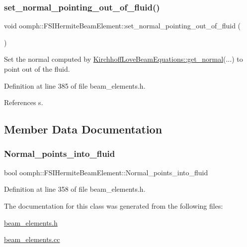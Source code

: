 \subsubsection{\texorpdfstring{set\+\_\+normal\+\_\+pointing\+\_\+out\+\_\+of\+\_\+fluid()}{set\_normal\_pointing\_out\_of\_fluid()}}
{\footnotesize\ttfamily void oomph\+::\+F\+S\+I\+Hermite\+Beam\+Element\+::set\+\_\+normal\+\_\+pointing\+\_\+out\+\_\+of\+\_\+fluid (\begin{DoxyParamCaption}{ }\end{DoxyParamCaption})\hspace{0.3cm}{\ttfamily [inline]}}



Set the normal computed by \hyperlink{classoomph_1_1KirchhoffLoveBeamEquations_a963a2ffb3c4008e3b9c175fc1d2d94cc}{Kirchhoff\+Love\+Beam\+Equations\+::get\+\_\+normal}(...) to point out of the fluid. 



Definition at line 385 of file beam\+\_\+elements.\+h.



References s.



\subsection{Member Data Documentation}
\mbox{\label{classoomph_1_1FSIHermiteBeamElement_aee929633dfedcd059ed2f4236739be40}} 
\subsubsection{\texorpdfstring{Normal\+\_\+points\+\_\+into\+\_\+fluid}{Normal\_points\_into\_fluid}}
{\footnotesize\ttfamily bool oomph\+::\+F\+S\+I\+Hermite\+Beam\+Element\+::\+Normal\+\_\+points\+\_\+into\+\_\+fluid\hspace{0.3cm}{\ttfamily [private]}}



Definition at line 358 of file beam\+\_\+elements.\+h.



The documentation for this class was generated from the following files\+:\begin{DoxyCompactItemize}
\item 
\hyperlink{beam__elements_8h}{beam\+\_\+elements.\+h}\item 
\hyperlink{beam__elements_8cc}{beam\+\_\+elements.\+cc}\end{DoxyCompactItemize}
